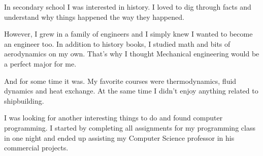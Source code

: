 \documentclass[12pt]{letter}
\begin{document}
\begin{llist}
  \endexperience


  \startexperience

            \item In secondary school I was interested in history. I loved to dig through facts and understand why things happened the way they happened.

            \item However, I grew in a family of engineers and I simply knew I wanted to become an engineer too. In addition to history books, I studied math and bits of aerodynamics on my own. That's why I thought Mechanical engineering would be a perfect major for me.

            \item And for some time it was. My favorite courses were thermodynamics, fluid dynamics and heat exchange. At the same time I didn't enjoy anything related to shipbuilding.

            \item I was looking for another interesting things to do and found computer programming. I started by completing all assignments for my programming class in one night and ended up assisting my Computer Science professor in his commercial projects.

  \endexperience

\end{llist}
\end{document}
